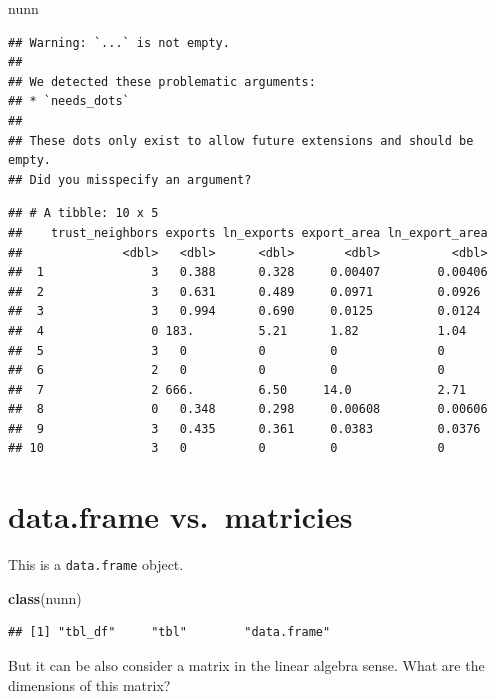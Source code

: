 \documentclass[
]{book}
\newenvironment{Shaded}{\begin{snugshade}}{\end{snugshade}}
\newcommand{\KeywordTok}[1]{\textcolor[rgb]{0.13,0.29,0.53}{\textbf{#1}}}
\newcommand{\NormalTok}[1]{#1}
\theoremstyle{definition}
\theoremstyle{definition}
\theoremstyle{definition}
\theoremstyle{definition}
\theoremstyle{remark}
\begin{document}
\begin{Shaded}
\begin{Highlighting}[]
\NormalTok{nunn}
\end{Highlighting}
\end{Shaded}

\begin{verbatim}
## Warning: `...` is not empty.
## 
## We detected these problematic arguments:
## * `needs_dots`
## 
## These dots only exist to allow future extensions and should be empty.
## Did you misspecify an argument?
\end{verbatim}

\begin{verbatim}
## # A tibble: 10 x 5
##    trust_neighbors exports ln_exports export_area ln_export_area
##              <dbl>   <dbl>      <dbl>       <dbl>          <dbl>
##  1               3   0.388      0.328     0.00407        0.00406
##  2               3   0.631      0.489     0.0971         0.0926 
##  3               3   0.994      0.690     0.0125         0.0124 
##  4               0 183.         5.21      1.82           1.04   
##  5               3   0          0         0              0      
##  6               2   0          0         0              0      
##  7               2 666.         6.50     14.0            2.71   
##  8               0   0.348      0.298     0.00608        0.00606
##  9               3   0.435      0.361     0.0383         0.0376 
## 10               3   0          0         0              0
\end{verbatim}

\hypertarget{data.frame-vs.-matricies}{%
\section{data.frame vs.~matricies}\label{data.frame-vs.-matricies}}

This is a \texttt{data.frame} object.

\begin{Shaded}
\begin{Highlighting}[]
\KeywordTok{class}\NormalTok{(nunn)}
\end{Highlighting}
\end{Shaded}

\begin{verbatim}
## [1] "tbl_df"     "tbl"        "data.frame"
\end{verbatim}

But it can be also consider a matrix in the linear algebra sense. What are the dimensions of this matrix?
\end{document}

